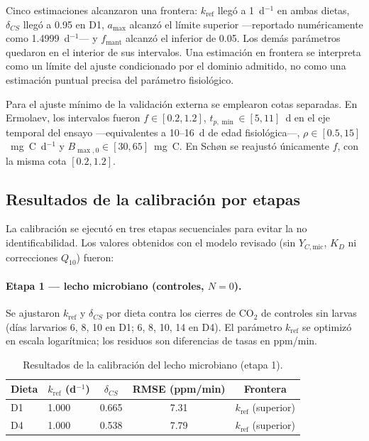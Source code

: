 Cinco estimaciones alcanzaron una frontera: $k_{\mathrm{ref}}$ llegó a
1~d$^{-1}$ en ambas dietas, $\delta_{CS}$ llegó a 0.95 en D1, $a_{\max}$
alcanzó el límite superior ---reportado numéricamente como 1.4999~d$^{-1}$---
y $f_{\mathrm{mant}}$ alcanzó el inferior de 0.05. Los demás parámetros
quedaron en el interior de sus intervalos. Una estimación en frontera se
interpreta como un límite del ajuste condicionado por el dominio admitido, no
como una estimación puntual precisa del parámetro fisiológico.

Para el ajuste mínimo de la validación externa se emplearon cotas separadas.
En Ermolaev, los intervalos fueron $f\in[0.2,1.2]$,
$t_{p,\min}\in[5,11]$~d en el eje temporal del ensayo ---equivalentes a
10--16~d de edad fisiológica---, $\rho\in[0.5,15]$~mg~C~d$^{-1}$ y
$B_{\max,0}\in[30,65]$~mg~C. En Schøn se reajustó únicamente $f$, con la
misma cota $[0.2,1.2]$.

\subsection{Resultados de la calibración por etapas}
\label{sup:resultados-calibracion}

La calibración se ejecutó en tres etapas secuenciales para evitar la no identificabilidad. Los valores obtenidos con el modelo revisado (sin $Y_{C,\mathrm{mic}}$, $K_D$ ni correcciones $Q_{10}$) fueron:

\paragraph{Etapa 1 --- lecho microbiano (controles, $N=0$).}
Se ajustaron $k_{\mathrm{ref}}$ y $\delta_{CS}$ por dieta contra los cierres de CO$_2$ de controles sin larvas (días larvarios 6, 8, 10 en D1; 6, 8, 10, 14 en D4). El parámetro $k_{\mathrm{ref}}$ se optimizó en escala logarítmica; los residuos son diferencias de tasas en ppm/min.

\begin{table}[htbp]
  \centering
  \small
  \caption{Resultados de la calibración del lecho microbiano (etapa 1).}
  \label{tab:s6-etapa1}
  \begin{tabular}{llccc}
    \toprule
    Dieta & $k_{\mathrm{ref}}$ (d$^{-1}$) & $\delta_{CS}$ & RMSE (ppm/min) & Frontera \\
    \midrule
    D1 & 1.000 & 0.665 & 7.31 & $k_{\mathrm{ref}}$ (superior) \\
    D4 & 1.000 & 0.538 & 7.79 & $k_{\mathrm{ref}}$ (superior) \\
    \bottomrule
  \end{tabular}
\end{table}

